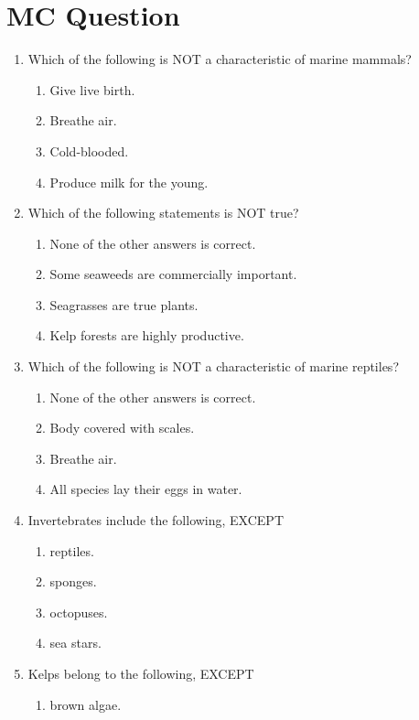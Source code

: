 \documentclass{report}
\begin{document}
\section{MC Question}
\begin{enumerate}
    \item Which of the following is NOT a characteristic of marine mammals?
    \begin{enumerate}
        \item   Give live birth. 
        \item   Breathe air. 
        \item   Cold-blooded. 
        \item   Produce milk for the young. 
    \end{enumerate}
    \item Which of the following statements is NOT true?
    \begin{enumerate}
        \item   None of the other answers is correct. 
        \item   Some seaweeds are commercially important. 
        \item   Seagrasses are true plants. 
        \item   Kelp forests are highly productive. 
    \end{enumerate}
    \item Which of the following is NOT a characteristic of marine reptiles?
    \begin{enumerate}
        \item   None of the other answers is correct. 
        \item   Body covered with scales. 
        \item   Breathe air. 
        \item   All species lay their eggs in water. 
    \end{enumerate}
    \item Invertebrates include the following, EXCEPT
    \begin{enumerate}
        \item reptiles.
        \item   sponges. 
        \item   octopuses. 
        \item   sea stars. 
    \end{enumerate}
    \item Kelps belong to the following, EXCEPT
    \begin{enumerate}
        \item   brown algae. 

\end{enumerate}
\end{enumerate}
\end{document}
